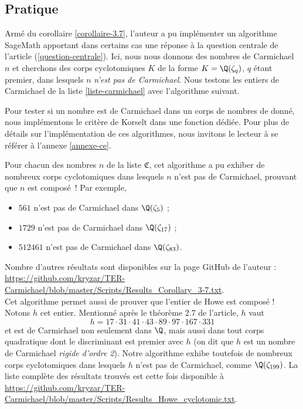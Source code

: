 \subsection{Pratique}

Armé du corollaire \ref{corollaire-3.7}, l'auteur a pu implémenter un algorithme SageMath apportant dans certains cas une réponse à la question centrale de l'article (\ref{question-centrale}). Ici, nous nous donnons des nombres de Carmichael $n$ et cherchons des corps cyclotomiques $K$ de la forme $K = \Q(\zeta_q)$, $q$ étant premier, dans lesquels $n$ \emph{n'est pas de Carmichael}. Nous testons les entiers de Carmichael de la liste \ref{liste-carmichael}  avec l'algorithme suivant.

\vspace{1em}
\begin{algorithm}[H]
\end{algorithm}
\vspace{1em}

\begin{remarque}
	Pour tester si un nombre est de Carmichael dans un corps de nombres de donné, nous implémentons le critère de Korselt dans une fonction dédiée. Pour plus de détails sur l'implémentation de ces algorithmes, nous invitons le lecteur à se référer à l'annexe \ref{annexe-ce}.
\end{remarque}

Pour chacun des nombres $n$ de la liste $\mathfrak{C}$, cet algorithme a pu exhiber de nombreux corps cyclotomiques dans lesquels $n$ n'est pas de Carmichael, prouvant que $n$ est composé~! Par exemple,
\begin{itemize}
	\item $561$ n'est pas de Carmichael dans $\Q(\zeta_5)$ ; 
	\item $1729$ n'est pas de Carmichael dans $\Q(\zeta_{17})$ ;
	\item $512461$ n'est pas de Carmichael dans $\Q(\zeta_{83})$.
\end{itemize}

Nombre d'autres résultats sont disponibles sur la page GitHub de l'auteur : \url{https://github.com/kryzar/TER-Carmichael/blob/master/Scripts/Results_Corollary_3-7.txt}. \\

Cet algorithme permet aussi de prouver que l'entier de Howe est composé ! Notons $h$ cet entier. Mentionné après le théorème 2.7 de l'article, $h$ vaut $$h = 17 \cdot 31 \cdot 41 \cdot 43 \cdot 89 \cdot 97 \cdot 167 \cdot 331$$ et est de Carmichael non seulement dans $\Q$, mais aussi dans tout corps quadratique dont le discriminant est premier avec $h$ (on dit que $h$ est un nombre de Carmichael \emph{rigide d'ordre 2}). Notre algorithme exhibe toutefois de nombreux corps cyclotomiques dans lesquels $h$ n'est pas de Carmichael, comme $\Q(\zeta_{199})$. La liste complète des résultats trouvés est cette fois disponible à \url{https://github.com/kryzar/TER-Carmichael/blob/master/Scripts/Results_Howe_cyclotomic.txt}.
